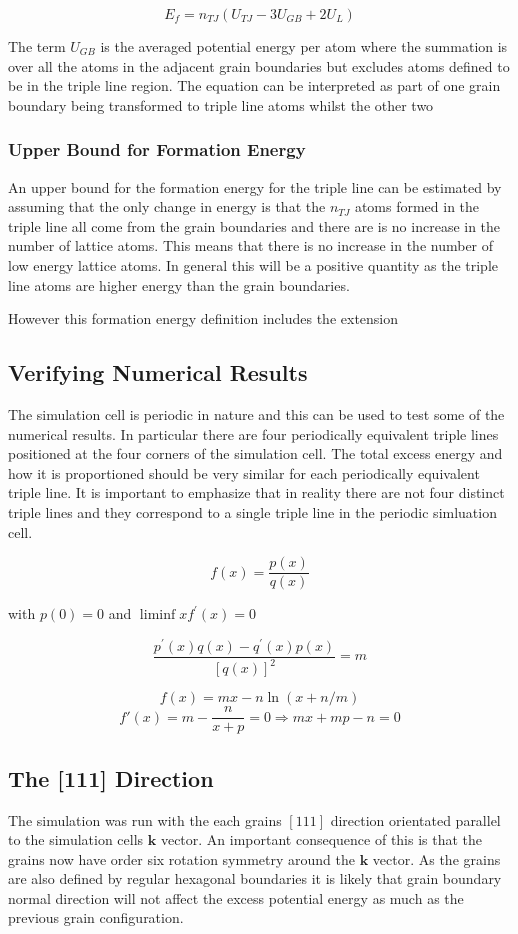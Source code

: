 \documentclass[12pt,a4paper]{book}
\begin{document}
\[ E_{f} = n_{TJ}\left(U_{TJ} -3U_{GB} + 2U_{L} \right) \]

The term $U_{GB}$ is the averaged potential energy per atom where the summation is over all the atoms in the adjacent grain boundaries but excludes atoms defined to be in the triple line region. The equation can be interpreted as part of one grain boundary being transformed to triple line atoms whilst the other two     

\subsubsection{Upper Bound for Formation Energy}

An upper bound for the formation energy for the triple line can be estimated by assuming that the only change in energy is that the  $n_{TJ}$ atoms formed in the triple line all come from the grain boundaries and there are is no increase in the number of lattice atoms. This means that there is no increase in the number of low energy lattice atoms. In general this will be a positive quantity as the triple line atoms are higher energy than the grain boundaries. 

However this formation energy definition includes the extension  

\subsection{Verifying Numerical Results}

The simulation cell is periodic in nature and this can be used to test some of the numerical results. In particular there are four periodically equivalent triple lines positioned at the four corners of the simulation cell. The total excess energy and how it is proportioned should be very similar for each periodically equivalent triple line. It is important to emphasize that in reality there are not four distinct triple lines and they correspond to a single triple line in the periodic simluation cell.


\[ f(x) = \frac{p(x)}{q(x)} \]

with $p(0)=0$ and $\liminf{x}{f^{\prime}(x)}=0$

\[ \frac{p^{\prime}(x)q(x) -q^{\prime}(x)p(x)}{[q(x)]^2} = m\]


\[ f(x) = mx - n\ln(x+n/m)\]
\[ f'(x) = m -\frac{n}{x+p} = 0 \Rightarrow  mx + mp - n = 0 \]


\subsection{The [111] Direction}
The simulation was run with the each grains $[111]$ direction orientated parallel to the simulation cells $\mathbf{k}$ vector. An important consequence of this is that the grains now have order six rotation symmetry around the $\mathbf{k}$ vector. As the grains are also defined by regular hexagonal boundaries it is likely that grain boundary normal direction will not affect the excess potential energy as much as the previous grain configuration.
\end{document}
